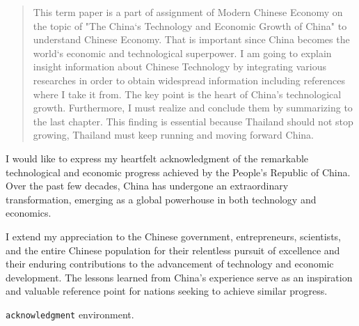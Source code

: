 \maketitle

\ifproject
\begin{abstract}
This term paper is a part of assignment of Modern Chinese Economy on the topic of 
"The China`s Technology and Economic Growth of China" to understand Chinese Economy.
That is important since China becomes the world`s economic and technological 
superpower. I am going to explain insight information about Chinese Technology by 
integrating various researches in order to obtain widespread information including 
references where I take it from. The key point is the heart of China's technological 
growth. Furthermore, I must realize and conclude them by summarizing to the last 
chapter. This finding is essential because Thailand should not stop growing, Thailand 
must keep running and moving forward China. 

\end{abstract}

\iffalse
\begin{dedication}
This document is dedicated to all Chiang Mai University students.

Dedication page is optional.
\end{dedication}
\fi %

\begin{acknowledgments}

I would like to express my heartfelt acknowledgment of the remarkable technological 
and economic progress achieved by the People's Republic of China. Over the past few 
decades, China has undergone an extraordinary transformation, emerging as a global 
powerhouse in both technology and economics. 

I extend my appreciation to the Chinese government, entrepreneurs, scientists, and 
the entire Chinese population for their relentless pursuit of excellence and their 
enduring contributions to the advancement of technology and economic development. 
The lessons learned from China's experience serve as an inspiration and valuable 
reference point for nations seeking to achieve similar progress.

\texttt{acknowledgment} environment.

\end{acknowledgments}%
\fi %

\contentspage

\ifproject
\figurelistpage

\tablelistpage
\fi %




